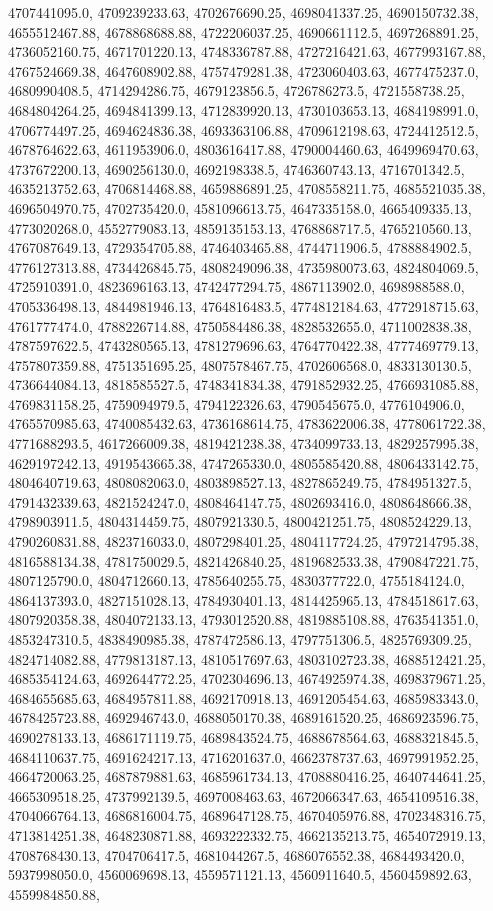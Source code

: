 4707441095.0, 4709239233.63, 4702676690.25, 4698041337.25, 4690150732.38, 4655512467.88, 4678868688.88, 4722206037.25, 4690661112.5, 4697268891.25, 4736052160.75, 4671701220.13, 4748336787.88, 4727216421.63, 4677993167.88, 4767524669.38, 4647608902.88, 4757479281.38, 4723060403.63, 4677475237.0, 4680990408.5, 4714294286.75, 4679123856.5, 4726786273.5, 4721558738.25, 4684804264.25, 4694841399.13, 4712839920.13, 4730103653.13, 4684198991.0, 4706774497.25, 4694624836.38, 4693363106.88, 4709612198.63, 4724412512.5, 4678764622.63, 4611953906.0, 4803616417.88, 4790004460.63, 4649969470.63, 4737672200.13, 4690256130.0, 4692198338.5, 4746360743.13, 4716701342.5, 4635213752.63, 4706814468.88, 4659886891.25, 4708558211.75, 4685521035.38, 4696504970.75, 4702735420.0, 4581096613.75, 4647335158.0, 4665409335.13, 4773020268.0, 4552779083.13, 4859135153.13, 4768868717.5, 4765210560.13, 4767087649.13, 4729354705.88, 4746403465.88, 4744711906.5, 4788884902.5, 4776127313.88, 4734426845.75, 4808249096.38, 4735980073.63, 4824804069.5, 4725910391.0, 4823696163.13, 4742477294.75, 4867113902.0, 4698988588.0, 4705336498.13, 4844981946.13, 4764816483.5, 4774812184.63, 4772918715.63, 4761777474.0, 4788226714.88, 4750584486.38, 4828532655.0, 4711002838.38, 4787597622.5, 4743280565.13, 4781279696.63, 4764770422.38, 4777469779.13, 4757807359.88, 4751351695.25, 4807578467.75, 4702606568.0, 4833130130.5, 4736644084.13, 4818585527.5, 4748341834.38, 4791852932.25, 4766931085.88, 4769831158.25, 4759094979.5, 4794122326.63, 4790545675.0, 4776104906.0, 4765570985.63, 4740085432.63, 4736168614.75, 4783622006.38, 4778061722.38, 4771688293.5, 4617266009.38, 4819421238.38, 4734099733.13, 4829257995.38, 4629197242.13, 4919543665.38, 4747265330.0, 4805585420.88, 4806433142.75, 4804640719.63, 4808082063.0, 4803898527.13, 4827865249.75, 4784951327.5, 4791432339.63, 4821524247.0, 4808464147.75, 4802693416.0, 4808648666.38, 4798903911.5, 4804314459.75, 4807921330.5, 4800421251.75, 4808524229.13, 4790260831.88, 4823716033.0, 4807298401.25, 4804117724.25, 4797214795.38, 4816588134.38, 4781750029.5, 4821426840.25, 4819682533.38, 4790847221.75, 4807125790.0, 4804712660.13, 4785640255.75, 4830377722.0, 4755184124.0, 4864137393.0, 4827151028.13, 4784930401.13, 4814425965.13, 4784518617.63, 4807920358.38, 4804072133.13, 4793012520.88, 4819885108.88, 4763541351.0, 4853247310.5, 4838490985.38, 4787472586.13, 4797751306.5, 4825769309.25, 4824714082.88, 4779813187.13, 4810517697.63, 4803102723.38, 4688512421.25, 4685354124.63, 4692644772.25, 4702304696.13, 4674925974.38, 4698379671.25, 4684655685.63, 4684957811.88, 4692170918.13, 4691205454.63, 4685983343.0, 4678425723.88, 4692946743.0, 4688050170.38, 4689161520.25, 4686923596.75, 4690278133.13, 4686171119.75, 4689843524.75, 4688678564.63, 4688321845.5, 4684110637.75, 4691624217.13, 4716201637.0, 4662378737.63, 4697991952.25, 4664720063.25, 4687879881.63, 4685961734.13, 4708880416.25, 4640744641.25, 4665309518.25, 4737992139.5, 4697008463.63, 4672066347.63, 4654109516.38, 4704066764.13, 4686816004.75, 4689647128.75, 4670405976.88, 4702348316.75, 4713814251.38, 4648230871.88, 4693222332.75, 4662135213.75, 4654072919.13, 4708768430.13, 4704706417.5, 4681044267.5, 4686076552.38, 4684493420.0, 5937998050.0, 4560069698.13, 4559571121.13, 4560911640.5, 4560459892.63, 4559984850.88, 